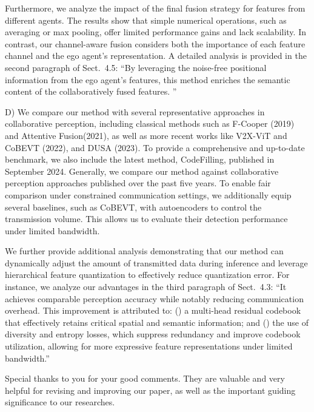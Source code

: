 \documentclass[12pt,a4paper]{article}
\begin{document}
Furthermore, we analyze the impact of the final fusion strategy for features from different agents. The results show that simple numerical operations, such as averaging or max pooling, offer limited performance gains and lack scalability. In contrast, our channel-aware fusion considers both the importance of each feature channel and the ego agent's representation. A detailed analysis is provided in the second paragraph of Sect.~4.5: ``By leveraging the noise-free positional information from the ego agent's features, this method enriches the semantic content of the collaboratively fused features. ''

D) We compare our method with several representative approaches in collaborative perception, including classical methods such as F-Cooper (2019) and Attentive Fusion(2021), as well as more recent works like V2X-ViT and CoBEVT (2022), and DUSA (2023). To provide a comprehensive and up-to-date benchmark, we also include the latest method, CodeFilling, published in September 2024.
Generally, we compare our method against collaborative perception approaches published over the past five years. To enable fair comparison under constrained communication settings, we additionally equip several baselines, such as CoBEVT, with autoencoders to control the transmission volume. This allows us to evaluate their detection performance under limited bandwidth.

We further provide additional analysis demonstrating that our method can dynamically adjust the amount of transmitted data during inference and leverage hierarchical feature quantization to effectively reduce quantization error. For instance, we analyze our advantages in the third paragraph of Sect.~4.3: ``It achieves comparable perception accuracy while notably reducing communication overhead. This improvement is attributed to: () a multi-head residual codebook that effectively retains critical spatial and semantic information; and () the use of diversity and entropy losses, which suppress redundancy and improve codebook utilization, allowing for more expressive feature representations under limited bandwidth.''


\vspace{6ex}
Special thanks to you for your good comments. They are valuable and very helpful for revising and improving our paper, as well as the important guiding significance to our researches.

\vspace{4ex}
\end{document}
